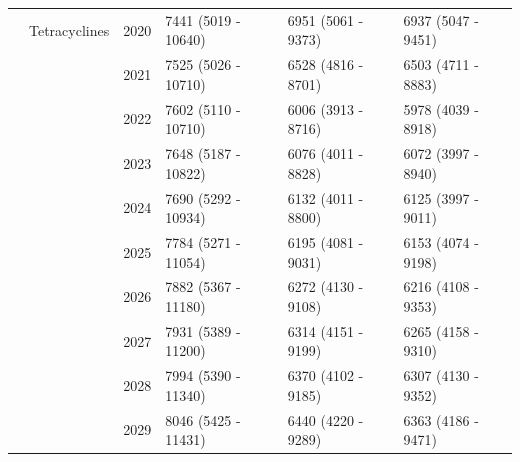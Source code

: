 \documentclass[
]{article}
\begin{document}
\begin{landscape}
\begin{longtable}[t]{llrlll}
\hspace{1em} & Tetracyclines & 2020 & 7441 (5019 - 10640) & 6951 (5061 - 9373) & 6937 (5047 - 9451)\\
\cmidrule{3-6}\nopagebreak
\hspace{1em} &  & 2021 & 7525 (5026 - 10710) & 6528 (4816 - 8701) & 6503 (4711 - 8883)\\
\cmidrule{3-6}\nopagebreak
\hspace{1em} &  & 2022 & 7602 (5110 - 10710) & 6006 (3913 - 8716) & 5978 (4039 - 8918)\\
\cmidrule{3-6}\nopagebreak
\hspace{1em} &  & 2023 & 7648 (5187 - 10822) & 6076 (4011 - 8828) & 6072 (3997 - 8940)\\
\cmidrule{3-6}\nopagebreak
\hspace{1em} &  & 2024 & 7690 (5292 - 10934) & 6132 (4011 - 8800) & 6125 (3997 - 9011)\\
\cmidrule{3-6}\nopagebreak
\hspace{1em} &  & 2025 & 7784 (5271 - 11054) & 6195 (4081 - 9031) & 6153 (4074 - 9198)\\
\cmidrule{3-6}\nopagebreak
\hspace{1em} &  & 2026 & 7882 (5367 - 11180) & 6272 (4130 - 9108) & 6216 (4108 - 9353)\\
\cmidrule{3-6}\nopagebreak
\hspace{1em} &  & 2027 & 7931 (5389 - 11200) & 6314 (4151 - 9199) & 6265 (4158 - 9310)\\
\cmidrule{3-6}\nopagebreak
\hspace{1em} &  & 2028 & 7994 (5390 - 11340) & 6370 (4102 - 9185) & 6307 (4130 - 9352)\\
\cmidrule{3-6}\nopagebreak
\hspace{1em} &  & 2029 & 8046 (5425 - 11431) & 6440 (4220 - 9289) & 6363 (4186 - 9471)\\*
\end{longtable}
\endgroup{}
\end{landscape}

\newpage

\printbibliography[title=References]
\end{document}
